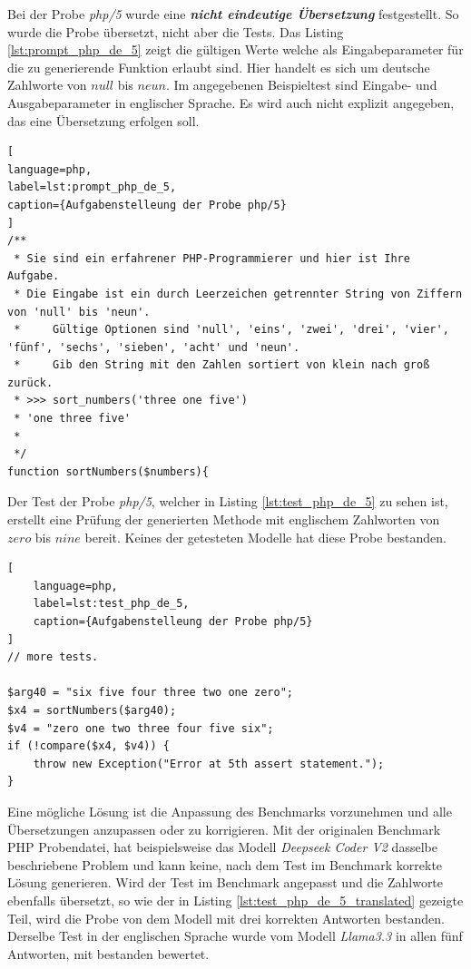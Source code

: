 Bei der Probe \textit{php/5} wurde eine \textit{\textbf{nicht eindeutige Übersetzung}} festgestellt. So wurde die Probe übersetzt, nicht aber die Tests. Das Listing \ref{lst:prompt_php_de_5} zeigt die gültigen Werte welche als Eingabeparameter für die zu generierende Funktion erlaubt sind. Hier handelt es sich um deutsche Zahlworte von $null$ bis $neun$. Im angegebenen Beispieltest sind Eingabe- und Ausgabeparameter in englischer Sprache. Es wird auch nicht explizit angegeben, das eine Übersetzung erfolgen soll.\vspace{0.2cm}

\begin{lstlisting}[
language=php,
label=lst:prompt_php_de_5,
caption={Aufgabenstelleung der Probe php/5}
]
/**
 * Sie sind ein erfahrener PHP-Programmierer und hier ist Ihre Aufgabe.
 * Die Eingabe ist ein durch Leerzeichen getrennter String von Ziffern von 'null' bis 'neun'.
 *     Gültige Optionen sind 'null', 'eins', 'zwei', 'drei', 'vier', 'fünf', 'sechs', 'sieben', 'acht' und 'neun'.
 *     Gib den String mit den Zahlen sortiert von klein nach groß zurück.
 * >>> sort_numbers('three one five')
 * 'one three five'
 *
 */
function sortNumbers($numbers){
\end{lstlisting}

Der Test der Probe \textit{php/5}, welcher in Listing \ref{lst:test_php_de_5} zu sehen ist, erstellt eine Prüfung der generierten Methode mit englischem Zahlworten von $zero$ bis $nine$ bereit. Keines der getesteten Modelle hat diese Probe bestanden.

\begin{lstlisting}[
	language=php,
	label=lst:test_php_de_5,
	caption={Aufgabenstelleung der Probe php/5}
]
// more tests.

$arg40 = "six five four three two one zero";
$x4 = sortNumbers($arg40);
$v4 = "zero one two three four five six";
if (!compare($x4, $v4)) {
    throw new Exception("Error at 5th assert statement.");
}
\end{lstlisting}

Eine mögliche Lösung ist die Anpassung des Benchmarks vorzunehmen und alle Übersetzungen anzupassen oder zu korrigieren. Mit der originalen Benchmark PHP Probendatei, hat beispielsweise das Modell \textit{Deepseek Coder V2} dasselbe beschriebene Problem und kann keine, nach dem Test im Benchmark korrekte Lösung generieren. Wird der Test im Benchmark angepasst und die Zahlworte ebenfalls übersetzt, so wie der in Listing \ref{lst:test_php_de_5_translated} gezeigte Teil, wird die Probe von dem Modell mit drei korrekten Antworten bestanden. Derselbe Test in der englischen Sprache wurde vom Modell \textit{Llama3.3} in allen fünf Antworten, mit bestanden bewertet.\vspace{0.2cm}

